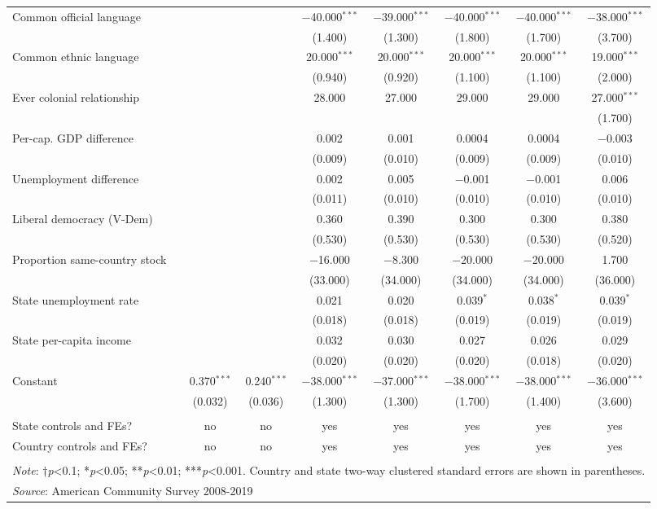\documentclass[
  11pt,
]{article}
\begin{document}
\begin{table}[H]
\begin{tabular}{@{\extracolsep{2pt}}lccccccc}
  Common official language &  &  & $-$40.000$^{***}$ & $-$39.000$^{***}$ & $-$40.000$^{***}$ & $-$40.000$^{***}$ & $-$38.000$^{***}$ \\ 
  &  &  & (1.400) & (1.300) & (1.800) & (1.700) & (3.700) \\ 
  Common ethnic language &  &  & 20.000$^{***}$ & 20.000$^{***}$ & 20.000$^{***}$ & 20.000$^{***}$ & 19.000$^{***}$ \\ 
  &  &  & (0.940) & (0.920) & (1.100) & (1.100) & (2.000) \\ 
  Ever colonial relationship &  &  & 28.000 & 27.000 & 29.000 & 29.000 & 27.000$^{***}$ \\ 
  &  &  &  &  &  &  & (1.700) \\ 
  Per-cap. GDP difference &  &  & 0.002 & 0.001 & 0.0004 & 0.0004 & $-$0.003 \\ 
  &  &  & (0.009) & (0.010) & (0.009) & (0.009) & (0.010) \\ 
  Unemployment difference &  &  & 0.002 & 0.005 & $-$0.001 & $-$0.001 & 0.006 \\ 
  &  &  & (0.011) & (0.010) & (0.010) & (0.010) & (0.010) \\ 
  Liberal democracy (V-Dem) &  &  & 0.360 & 0.390 & 0.300 & 0.300 & 0.380 \\ 
  &  &  & (0.530) & (0.530) & (0.530) & (0.530) & (0.520) \\ 
  Proportion same-country stock &  &  & $-$16.000 & $-$8.300 & $-$20.000 & $-$20.000 & 1.700 \\ 
  &  &  & (33.000) & (34.000) & (34.000) & (34.000) & (36.000) \\ 
  State unemployment rate &  &  & 0.021 & 0.020 & 0.039$^{*}$ & 0.038$^{*}$ & 0.039$^{*}$ \\ 
  &  &  & (0.018) & (0.018) & (0.019) & (0.019) & (0.019) \\ 
  State per-capita income &  &  & 0.032 & 0.030 & 0.027 & 0.026 & 0.029 \\ 
  &  &  & (0.020) & (0.020) & (0.020) & (0.018) & (0.020) \\ 
  Constant & 0.370$^{***}$ & 0.240$^{***}$ & $-$38.000$^{***}$ & $-$37.000$^{***}$ & $-$38.000$^{***}$ & $-$38.000$^{***}$ & $-$36.000$^{***}$ \\ 
  & (0.032) & (0.036) & (1.300) & (1.300) & (1.700) & (1.400) & (3.600) \\ 
 \hline \\[-1.8ex] 
State controls and FEs? & no & no & yes & yes & yes & yes & yes \\ 
Country controls and FEs? & no & no & yes & yes & yes & yes & yes \\ 
\hline 
\hline \\[-1.8ex] 
\multicolumn{8}{l}{\parbox[t]{\textwidth}{\textit{Note}: †\textit{p}<0.1; *\textit{p}<0.05; **\textit{p}<0.01; ***\textit{p}<0.001. Country and state two-way clustered standard errors are shown in parentheses.}} \\ 
\multicolumn{8}{l}{\textit{Source}: American Community Survey 2008-2019} \\ 
\end{tabular} 
\end{table}
\end{document}

